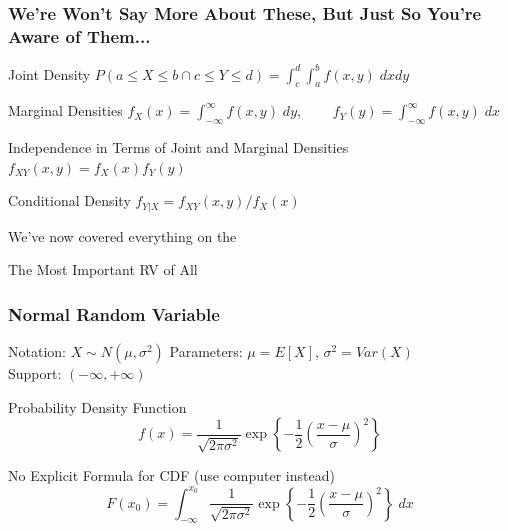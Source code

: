 \documentclass[handout]{beamer}
\begin{document}
\begin{frame}
\frametitle{We're Won't Say More About These, But Just So You're Aware of Them...}

\begin{block}{Joint Density}
$ \displaystyle P(a\leq X \leq b \cap c\leq Y \leq d) = \int_c^d \int_a^b f(x,y) \; dxdy$
\end{block}
\begin{block}{Marginal Densities}
$f_X(x) = \int_{-\infty}^\infty f(x,y)\; dy$, $\;\;\;\;\;\;\; f_Y(y) = \int_{-\infty}^\infty f(x,y)\; dx$
\end{block}
\begin{block}{Independence in Terms of Joint and Marginal Densities}
$f_{XY}(x,y) = f_X(x)f_Y(y)$
\end{block}
\begin{block}{Conditional Density}
$f_{Y|X} = f_{XY}(x,y)/f_X(x)$
\end{block}

\end{frame}

\begin{frame}

\huge We've now covered everything on the \href{http://fditraglia.github.io/Econ103Public/RandomVariablesHandout.pdf}{\textcolor{blue}{}}

\end{frame}
\begin{frame}
\Huge \begin{center}
The Most Important RV of All
\end{center}

\end{frame}
\begin{frame}
\frametitle{Normal Random Variable}
\begin{block}{Notation: $X \sim N(\mu, \sigma^2)$}
Parameters: $\mu = E[X]$, $\sigma^2 = Var(X)$\\ Support:  $(-\infty, +\infty)$
\end{block}


\begin{block}{Probability Density Function}
	$$ f(x) = \frac{1}{\sqrt{2\pi \sigma^2}} \exp \left\{ - \frac{1}{2} \left(\frac{x - \mu}{\sigma} \right)^2 \right\}$$
\end{block}


\begin{block}{No Explicit Formula for CDF (use computer instead)}
	$$F(x_0) = \int_{-\infty}^{x_0}  \frac{1}{\sqrt{2\pi \sigma^2}} \exp \left\{ - \frac{1}{2} \left(\frac{x - \mu}{\sigma} \right)^2 \right\} \; dx$$
\end{block}
\end{frame}
\end{document}
